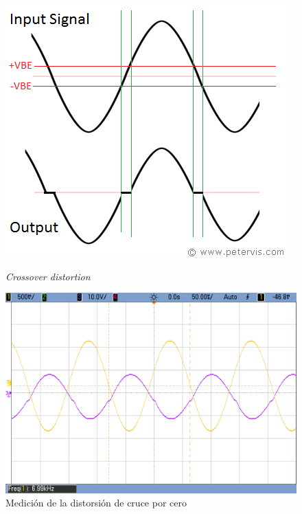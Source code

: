 \begin{figure}[H]
\begin{centering}
\includegraphics[scale=0.5]{../Ex1/iA/Resources1a/crossover}
\par\end{centering}
\caption{\emph{Crossover distortion}}
\emph{\label{1_a_7}}
\end{figure}

\begin{figure}[H]
\begin{centering}
\includegraphics[scale=0.3]{../Ex1/iA/Resources1a/CrossDistmed}
\par\end{centering}
\caption{Medición de la distorsión de cruce por cero}

\end{figure}

